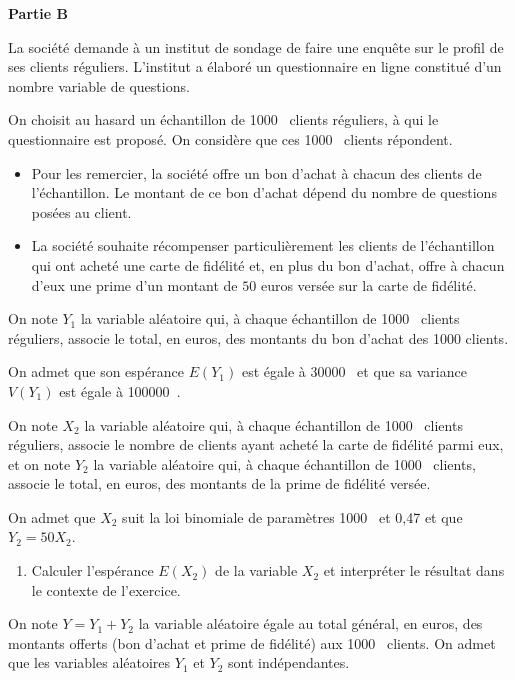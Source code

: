 \documentclass[10pt]{article}
\providecommand{\np}[2][]{{#2~#1}}
\begin{document}
\medskip

\textbf{Partie B}

\medskip

La société demande à un institut de sondage de faire une enquête sur le profil de ses clients réguliers. L'institut a élaboré un questionnaire en ligne constitué d'un nombre variable de questions.

On choisit au hasard un échantillon de \np{1000} clients réguliers, à qui le questionnaire est proposé. On considère que ces \np{1000} clients répondent.

\begin{itemize}[label=$\bullet~$]
\item Pour les remercier, la société offre un bon d'achat à chacun des clients de l'échantillon. Le montant de ce bon d'achat dépend du nombre de questions posées au client.
\item La société souhaite récompenser particulièrement les clients de l'échantillon qui ont acheté une carte de fidélité et, en plus du bon d'achat, offre à chacun d'eux une prime d'un montant de $50$ euros versée sur la carte de fidélité.
\end{itemize}

On note $Y_1$ la variable aléatoire qui, à chaque échantillon de \np{1000} clients réguliers, associe le total, en euros, des montants du bon d'achat des 1000 clients. 

On admet que son espérance $E\left(Y_1\right)$ est égale à \np{30000} et que sa variance $V\left(Y_1\right)$ est égale à \np{100000}.

On note $X_2$ la variable aléatoire qui, à chaque échantillon de \np{1000} clients réguliers, associe le nombre de clients ayant acheté la carte de fidélité parmi eux, et on note $Y_2$ la variable aléatoire qui, à chaque échantillon de \np{1000} clients, associe le total, en euros, des montants de la prime de fidélité versée.

On admet que $X_2$ suit la loi binomiale de paramètres \np{1000} et 0,47 et que $Y_2 = 50X_2$.

\medskip


\begin{enumerate}
\item Calculer l'espérance $E\left(X_2\right)$ de la variable $X_2$ et interpréter le résultat dans le contexte de l'exercice.
\end{enumerate}

On note $Y = Y_1 + Y_2$ la variable aléatoire égale au total général, en euros, des montants offerts (bon d'achat et prime de fidélité) aux \np{1000} clients. On admet que les variables aléatoires $Y_1$ et $Y_2$ sont indépendantes.
\end{document}
